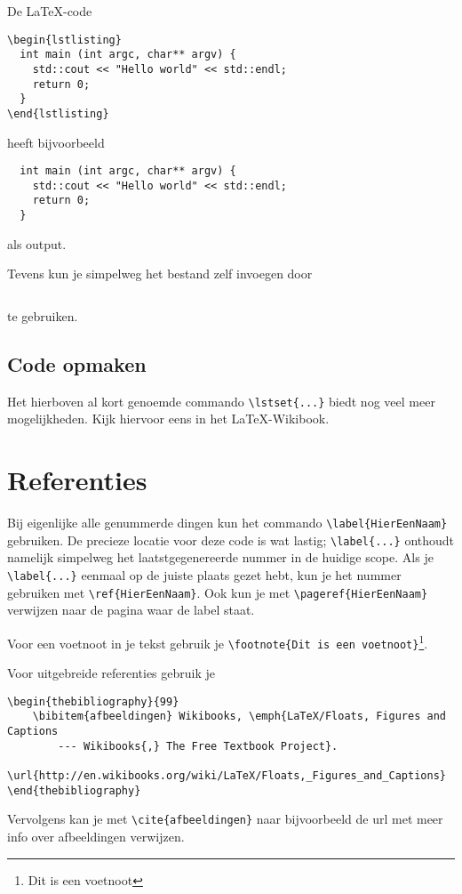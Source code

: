 De \LaTeX-code
\begin{verbatim}
\begin{lstlisting}
  int main (int argc, char** argv) {
    std::cout << "Hello world" << std::endl;
    return 0;
  }
\end{lstlisting}
\end{verbatim}
heeft bijvoorbeeld
\begin{lstlisting}
  int main (int argc, char** argv) {
    std::cout << "Hello world" << std::endl;
    return 0;
  }
\end{lstlisting}
als output.

Tevens kun je simpelweg het bestand zelf invoegen door
\begin{verbatim}

\end{verbatim}
te gebruiken.

\subsection{Code opmaken}

Het hierboven al kort genoemde commando \verb+\lstset{...}+ biedt nog veel meer
mogelijkheden. Kijk hiervoor eens in het \LaTeX-Wikibook.

\section{Referenties}
Bij eigenlijke alle genummerde dingen kun het commando
\verb+\label{HierEenNaam}+ gebruiken. De precieze locatie voor deze code is wat
lastig; \verb|\label{...}| onthoudt namelijk simpelweg het laatstgegenereerde
nummer in de huidige scope. Als je \verb|\label{...}| eenmaal op de juiste
plaats gezet hebt, kun je het nummer gebruiken met \verb+\ref{HierEenNaam}+.
Ook kun je met \verb+\pageref{HierEenNaam}+ verwijzen naar de pagina waar de
label staat.

Voor een voetnoot in je tekst gebruik je
\verb+\footnote{Dit is een voetnoot}+\footnote{Dit is een voetnoot}.

Voor uitgebreide referenties gebruik je
\begin{verbatim}
\begin{thebibliography}{99}
    \bibitem{afbeeldingen} Wikibooks, \emph{LaTeX/Floats, Figures and Captions
        --- Wikibooks{,} The Free Textbook Project}.
        \url{http://en.wikibooks.org/wiki/LaTeX/Floats,_Figures_and_Captions}
\end{thebibliography}
\end{verbatim}
Vervolgens kan je met \verb.\cite{afbeeldingen}. naar bijvoorbeeld de url met
meer info over afbeeldingen verwijzen\cite{afbeeldingen}.

